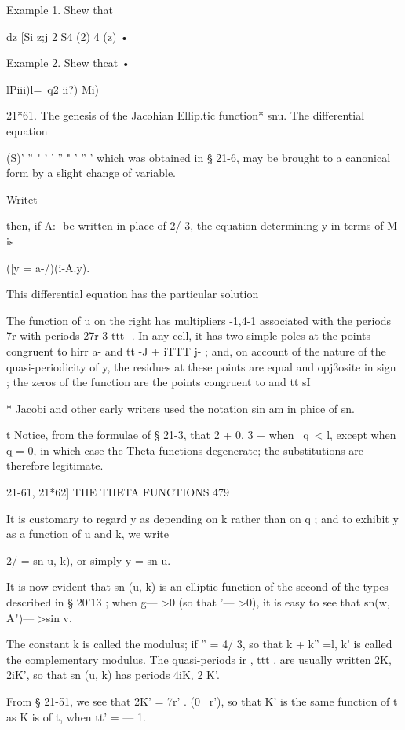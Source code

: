 Example 1. Shew that

dz [Si z;j 2 S4 (2) 4 (z) •

Example 2. Shew thcat •

lPiii)l=\ q2 ii?) Mi)

21*61. The genesis of the Jacohian Ellip.tic function* snu. The
differential equation

(S)' '' " ' ' '' " ' '' ' which was obtained in § 21-6, may be brought
to a canonical form by a slight change of variable.

Writet %

then, if A:- be written in place of 2/ 3, the equation determining y
in terms of M is

(|y = a-/)(i-A.y).

This differential equation has the particular solution

The function of u on the right has multipliers -1,4-1 associated with
the periods 7r%
with periods 27r 3 ttt -. In any cell, it has two simple poles at the
points congruent to hirr a- and tt -J + iTTT j- ; and, on account of
the nature of the quasi-periodicity of y, the residues at these points
are equal and opj3osite in sign ; the zeros of the function are the
points congruent to and tt sI

* Jacobi and other early writers used the notation sin am in phice of
sn.

t Notice, from the formulae of § 21-3, that 2 + 0, 3 + when \ q\ < l,
except when q = 0, in which case the Theta-functions degenerate; the
substitutions are therefore legitimate.



21-61, 21*62] THE THETA FUNCTIONS 479

It is customary to regard y as depending on k rather than on q ; and
to exhibit y as a function of u and k, we write

2/ = sn u, k), or simply y = sn u.

It is now evident that sn (u, k) is an elliptic function of the second
of the types described in § 20'13 ; when g— >0 (so that '— >0), it is
easy to see that sn(w, A")— >sin v.

The constant k is called the modulus; if '' = 4/ 3, so that k + k''
=l, k' is called the complementary modulus. The quasi-periods ir , ttt
. are usually written 2K, 2iK', so that sn (u, k) has periods 4iK, 2
K'.

From § 21-51, we see that 2K' = 7r' . (0 \ r'), so that K' is the same
function of t as K is of t, when tt' = — 1.

